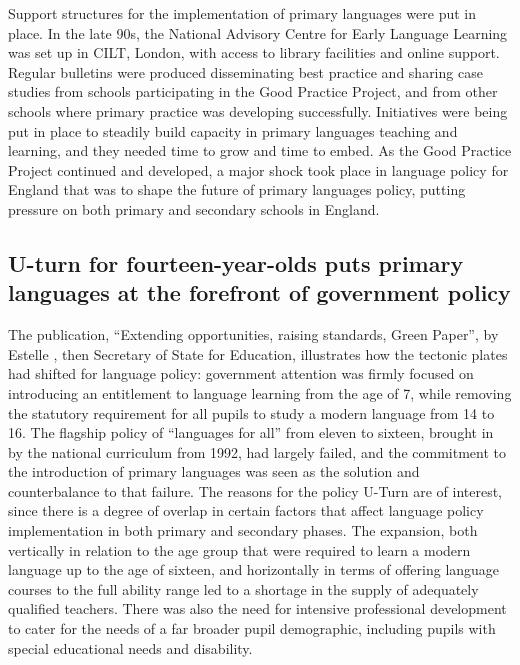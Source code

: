 \documentclass[output=paper]{langscibook}
\begin{document}
Support structures for the implementation of primary languages were put in place. In the late 90s, the National Advisory Centre for Early Language Learning was set up in CILT, London, with access to library facilities and online support. Regular bulletins were produced disseminating best practice and sharing case studies from schools participating in the Good Practice Project, and from other schools where primary practice was developing successfully. Initiatives were being put in place to steadily build capacity in primary languages teaching and learning, and they needed time to grow and time to embed. As the Good Practice Project continued and developed, a major shock took place in language policy for England that was to shape the future of primary languages policy, putting pressure on both primary and secondary schools in England.

\subsection{U-turn for fourteen-year-olds puts primary languages at the forefront of government policy}

The \citeyear{Morris2002} publication, ``Extending opportunities, raising standards, Green Paper'', by Estelle \citeauthor{Morris2002}, then Secretary of State for Education, illustrates how the tectonic plates had shifted for language policy: government attention was firmly focused on introducing an entitlement to language learning from the age of 7, while removing the statutory requirement for all pupils to study a modern language from 14 to 16. The flagship policy of ``languages for all'' from eleven to sixteen, brought in by the national curriculum from 1992, had largely failed, and the commitment to the introduction of primary languages was seen as the solution and counterbalance to that failure. The reasons for the policy U-Turn are of interest, since there is a degree of overlap in certain factors that affect language policy implementation in both primary and secondary phases. The expansion, both vertically in relation to the age group that were required to learn a modern language up to the age of sixteen, and horizontally in terms of offering language courses to the full ability range led to a shortage in the supply of adequately qualified teachers. There was also the need for intensive professional development to cater for the needs of a far broader pupil demographic, including pupils with special educational needs and disability.
\end{document}
